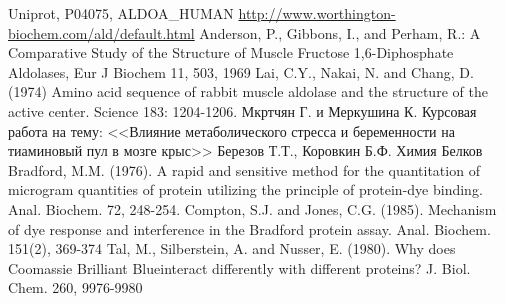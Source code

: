 \begin{thebibliography}{WW}
 Uniprot, P04075, ALDOA\_HUMAN
 \url{http://www.worthington-biochem.com/ald/default.html}
 Anderson, P., Gibbons, I., and Perham, R.:
    A Comparative Study of the Structure of Muscle Fructose 1,6-Diphosphate Aldolases,
    Eur J Biochem 11, 503, 1969
  Lai, C.Y., Nakai, N. and Chang, D. (1974)
    Amino acid sequence of rabbit muscle aldolase and the structure of the active center.
    Science 183: 1204-1206.
 Мкртчян Г. и Меркушина К.
    Курсовая работа  на тему:
    <<Влияние метаболического стресса и беременности на тиаминовый пул в мозге крыс>>
 Березов Т.Т., Коровкин Б.Ф.
    Химия Белков
 Bradford, M.M. (1976).
    A rapid and sensitive method for the quantitation of microgram quantities of
    protein utilizing the principle of protein-dye binding. Anal. Biochem. 72, 248-254.
 Compton, S.J. and Jones, C.G. (1985).
    Mechanism of dye response and interference in the Bradford protein assay.
    Anal. Biochem. 151(2), 369-374
 Tal, M., Silberstein, A. and Nusser, E. (1980).
    Why does Coomassie Brilliant Blue\textregistered interact differently with different proteins?
    J. Biol. Chem. 260, 9976-9980
\end{thebibliography}

